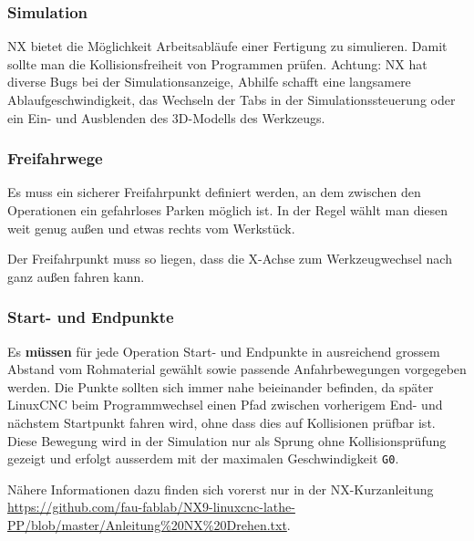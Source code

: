 \documentclass{\basedir/fablab-document}
\begin{document}


\subsubsection{Simulation}

NX bietet die Möglichkeit Arbeitsabläufe einer Fertigung zu simulieren. Damit sollte man die Kollisionsfreiheit von Programmen prüfen. Achtung: NX hat diverse Bugs bei der Simulationsanzeige, Abhilfe schafft eine langsamere Ablaufgeschwindigkeit, das Wechseln der Tabs in der Simulationssteuerung oder ein Ein- und Ausblenden des 3D-Modells des Werkzeugs.

\subsubsection{Freifahrwege}
Es muss ein sicherer Freifahrpunkt definiert werden, an dem zwischen den Operationen ein gefahrloses Parken möglich ist. In der Regel wählt man diesen weit genug außen und etwas rechts vom Werkstück.

Der Freifahrpunkt muss so liegen, dass die X-Achse zum Werkzeugwechsel nach ganz außen fahren kann.

\subsubsection{Start- und Endpunkte}

Es \textbf{müssen} für jede Operation Start- und Endpunkte in ausreichend grossem Abstand vom Rohmaterial gewählt sowie passende Anfahrbewegungen vorgegeben werden. Die Punkte sollten sich immer nahe beieinander befinden, da später LinuxCNC beim Programmwechsel einen Pfad zwischen vorherigem End- und nächstem Startpunkt fahren wird, ohne dass dies auf Kollisionen prüfbar ist.
Diese Bewegung wird in der Simulation nur als Sprung ohne Kollisionsprüfung gezeigt und erfolgt ausserdem mit der maximalen Geschwindigkeit \texttt{G0}.

Nähere Informationen dazu finden sich vorerst nur in der NX-Kurzanleitung \url{https://github.com/fau-fablab/NX9-linuxcnc-lathe-PP/blob/master/Anleitung%20NX%20Drehen.txt}.
\end{document}
